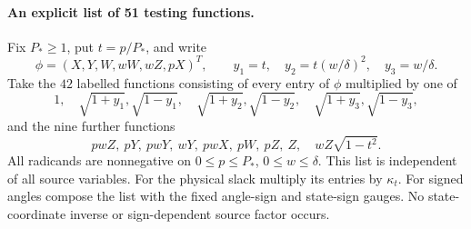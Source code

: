\paragraph{An explicit list of 51 testing functions.}
Fix $P_*\ge1$, put $t=p/P_*$, and write
\[
 \phi=(X,Y,W,wW,wZ,pX)^T,\qquad
 y_1=t,\quad y_2=t(w/\delta)^2,\quad y_3=w/\delta.
\]
Take the $42$ labelled functions consisting of every entry of $\phi$
multiplied by one of
\[
 1,\quad\sqrt{1+y_1},\sqrt{1-y_1},\quad
 \sqrt{1+y_2},\sqrt{1-y_2},\quad
 \sqrt{1+y_3},\sqrt{1-y_3},
\]
and the nine further functions
\[
 pwZ,\ pY,\ pwY,\ wY,\ pwX,\ pW,\ pZ,\ Z,
                         \quad wZ\sqrt{1-t^2}.
\]
All radicands are nonnegative on $0\le p\le P_*$,
$0\le w\le\delta$. This list is independent of all source variables.
For the physical slack multiply its entries by $\kappa_t$.
For signed angles compose the list with the fixed angle-sign and
state-sign gauges. No state-coordinate inverse or sign-dependent
source factor occurs.


